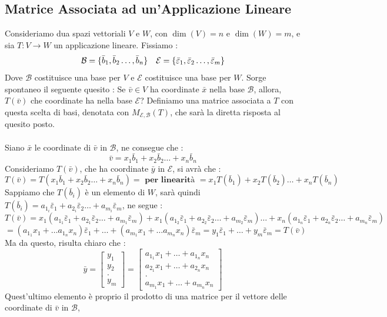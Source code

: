 \documentclass[12pt, letterpaper]{article}
\newcommand{\E}{{\mathcal E}}
\newcommand{\B}{{\mathcal B}}
\newcommand{\ve}{{\bar v}}
\newcommand{\spaz}{{\text{\hphantom{aa}}}}
\newcommand{\acc}{\\\hphantom{}\\}
\begin{document}
\subsection{Matrice Associata ad un'Applicazione Lineare}
Consideriamo dua spazi vettoriali \(V\) e \(W\), con \(\dim(V)=n\) e \(\dim(W)=m\), e sia \(T:V\rightarrow W\) 
un applicazione lineare. Fissiamo : $$
\mathcal{B}=\{\bar b_1,\bar b_2\dots,\bar b_n\}\spaz
\mathcal{E}=\{\bar \varepsilon_1,\bar \varepsilon_2\dots,\bar \varepsilon_m\}
$$
Dove \(\mathcal{B}\) costituisce una base per \(V\) e \(\mathcal{E}\) costituisce una base per \(W\). Sorge spontaneo il 
seguente quesito : Se \(\ve \in V\) ha coordinate \(\bar x\) nella base \(\mathcal{B}\), allora, \(T(\ve)\) che 
coordinate ha nella base \(\mathcal{E}\)? Definiamo una matrice associata a \(T\) con questa scelta 
di basi, denotata con \(M_{\E,\B}(T)\), che sarà la diretta risposta al quesito posto.\acc 
Siano \(\bar x\) le coordinate di \(\bar v\) in \(\B\), ne consegue che :$$
\bar v=x_1\bar b_1+x_2\bar b_2\dots+x_n\bar b_n
$$Consideriamo \(T(\bar v)\), che ha coordinate \(\bar y\) in \(\E\), si avrà che : $$
T(\ve)=T(x_1\bar b_1+x_2\bar b_2\dots+x_n\bar b_n)=\textbf{ per linearità }=x_1T(\bar b_1)+x_2T(\bar b_2)\dots + x_nT(\bar b_n)
$$
Sappiamo che \(T(\bar b_i)\) è un elemento di \(W\), sarà quindi 
 \(T(\bar b_i)=a_{1_i}\bar\varepsilon_1+a_{2_i}\bar\varepsilon_2\dots +a_{m_i}\bar\varepsilon_m\), ne segue :$$
T(\ve)=x_1(a_{1_1}\bar\varepsilon_1+a_{2_1}\bar\varepsilon_2\dots +a_{m_1}\bar\varepsilon_m)+
x_1(a_{1_2}\bar\varepsilon_1+a_{2_2}\bar\varepsilon_2\dots +a_{m_2}\bar\varepsilon_m)\dots+
x_n(a_{1_n}\bar\varepsilon_1+a_{2_n}\bar\varepsilon_2\dots +a_{m_n}\bar\varepsilon_m)
 $$$$
 =(a_{1_1}x_1+\dots a_{1_n}x_n)\bar\varepsilon_1+\dots +(a_{m_1}x_1+\dots a_{m_n}x_n)\bar\varepsilon_m=
 y_1\bar\varepsilon_1+\dots+y_m\bar\varepsilon_m=T(\bar v)
 $$
 Ma da questo, risulta chiaro che : $$
 \bar y=\begin{bmatrix}y_1\\y_2\\.\\y_m\end{bmatrix}=
 \begin{bmatrix}a_{1_1}x_1+\dots +a_{1_n}x_n\\a_{2_1}x_1+\dots +a_{2_n}x_n\\.\\a_{m_1}x_1+\dots+ a_{m_n}x_n\end{bmatrix}
 $$
 Quest'ultimo elemento è proprio il prodotto di una matrice per il vettore delle coordinate di \(\ve\) in \(\B\), 
\end{document}
